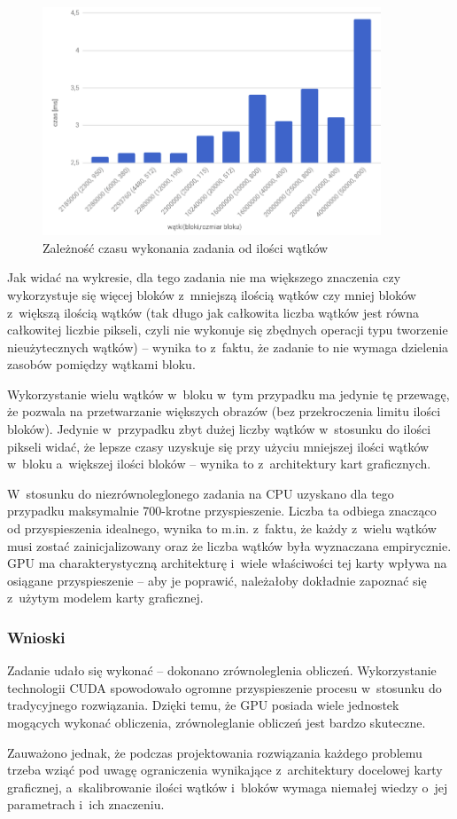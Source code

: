 \documentclass[a4paper,12pt]{article}
\begin{document}
\begin{figure}[!hbtp]
 \centering
  \includegraphics[width=0.9\textwidth]{wykres.png}
  \caption{Zależność czasu wykonania zadania od ilości wątków}
\end{figure}
Jak widać na wykresie, dla tego zadania nie ma większego znaczenia czy wykorzystuje się więcej bloków z~mniejszą ilością wątków czy mniej bloków z~większą ilością wątków (tak długo jak całkowita liczba wątków jest równa całkowitej liczbie pikseli, czyli nie wykonuje się zbędnych operacji typu tworzenie nieużytecznych wątków) -- wynika to z~faktu, że zadanie to nie wymaga dzielenia zasobów pomiędzy wątkami bloku.

Wykorzystanie wielu wątków w~bloku w~tym przypadku ma jedynie tę przewagę, że pozwala na przetwarzanie większych obrazów (bez przekroczenia limitu ilości bloków). Jedynie w~przypadku zbyt dużej liczby wątków w~stosunku do ilości pikseli widać, że lepsze czasy uzyskuje się przy użyciu mniejszej ilości wątków w~bloku a~większej ilości bloków -- wynika to z~architektury kart graficznych.

W~stosunku do niezrównoleglonego zadania na CPU uzyskano dla tego przypadku maksymalnie 700-krotne przyspieszenie. Liczba ta odbiega znacząco od przyspieszenia idealnego, wynika to m.in. z~faktu, że każdy z~wielu wątków musi zostać zainicjalizowany oraz że liczba wątków była wyznaczana empirycznie. GPU ma charakterystyczną architekturę i~wiele właściwości tej karty wpływa na osiągane przyspieszenie -- aby je poprawić, należałoby dokładnie zapoznać się z~użytym modelem karty graficznej.

\subsubsection*{Wnioski }
Zadanie udało się wykonać -- dokonano zrównoleglenia obliczeń. Wykorzystanie technologii CUDA spowodowało ogromne przyspieszenie procesu w~stosunku do tradycyjnego rozwiązania. Dzięki temu, że GPU posiada wiele jednostek mogących wykonać obliczenia, zrównoleglanie obliczeń jest bardzo skuteczne.

Zauważono jednak, że podczas projektowania rozwiązania każdego problemu trzeba wziąć pod uwagę ograniczenia wynikające z~architektury docelowej karty graficznej, a~skalibrowanie ilości wątków i~bloków wymaga niemałej wiedzy o~jej parametrach i~ich znaczeniu.
\end{document}
